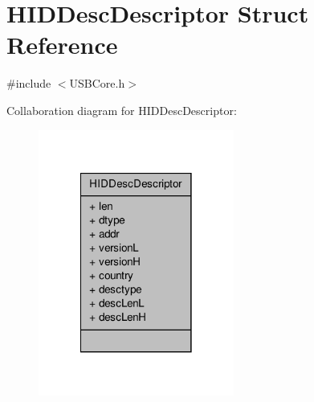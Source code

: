 \hypertarget{struct_h_i_d_desc_descriptor}{\section{H\-I\-D\-Desc\-Descriptor Struct Reference}
\label{struct_h_i_d_desc_descriptor}
}


{\ttfamily \#include $<$U\-S\-B\-Core.\-h$>$}



Collaboration diagram for H\-I\-D\-Desc\-Descriptor\-:
\nopagebreak
\begin{figure}[H]
\begin{center}
\leavevmode
\includegraphics[width=182pt]{struct_h_i_d_desc_descriptor__coll__graph}
\end{center}
\end{figure}

